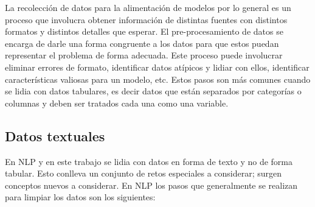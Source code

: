 La recolección de datos para la alimentación de modelos por lo general es un proceso que involucra obtener información de distintas fuentes con distintos formatos y distintos detalles que esperar. El pre-procesamiento de datos se encarga de darle una forma congruente a los datos para que estos puedan representar el problema de forma adecuada. Este proceso puede involucrar eliminar errores de formato, identificar datos atípicos y lidiar con ellos, identificar características valiosas para un modelo, etc. Estos pasos son más comunes cuando se lidia con datos tabulares, es decir datos que están separados por categorías o columnas y deben ser tratados cada una como una variable.

\subsection{Datos textuales}

En NLP y en este trabajo se lidia con datos en forma de texto y no de forma tabular. Esto conlleva un conjunto de retos especiales a considerar; surgen conceptos nuevos a considerar. En NLP los pasos que generalmente se realizan para limpiar los datos son los siguientes:

